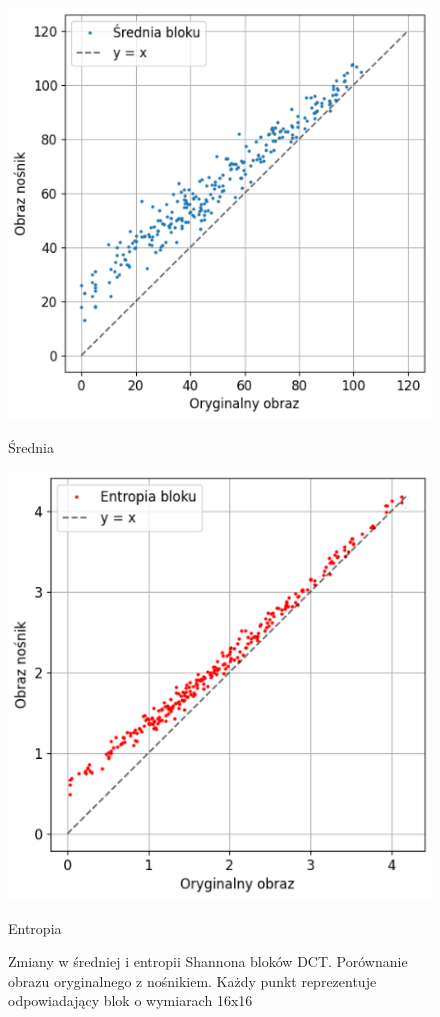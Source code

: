 \documentclass[a4paper,12pt]{article}
\begin{document}
        \begin{figure}[h]
            \centering
            \begin{minipage}{0.45\textwidth}
                \centering
                \includegraphics[width=\textwidth]{img/mean_dct.png}
                \caption{Średnia}
            \end{minipage}
            \hfill
            \begin{minipage}{0.45\textwidth}
                \centering
                \includegraphics[width=\textwidth]{img/ent_dct.png}
                \caption{Entropia}
            \end{minipage}
            \caption{Zmiany w średniej i entropii Shannona bloków DCT. Porównanie obrazu oryginalnego z nośnikiem. Każdy punkt reprezentuje odpowiadający blok o wymiarach 16x16}
            \label{compare_mean_ent}
        \end{figure}   
\end{document}
